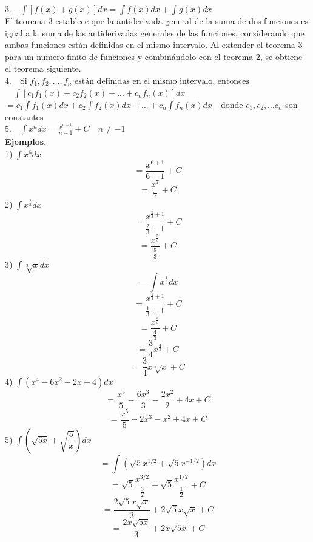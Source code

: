 \documentclass[11pt]{report}
\begin{document}
\hspace*{10mm}3.$\quad\displaystyle\int [f(x)+g(x)]dx=\int f(x)dx + \int g(x)dx$\\[2mm]
\hspace*{10mm}El teorema 3 establece que la antiderivada general de la suma de dos funciones es igual a la suma de las antiderivadas generales de las funciones, considerando que ambas funciones están definidas en el mismo intervalo. Al extender el teorema 3 para un numero finito de funciones y combinándolo con el teorema 2, se obtiene el teorema siguiente.\\[2mm]
\hspace*{10mm}4.$\quad\text{Si $f_1,f_2,...,f_n$ están definidas en el mismo intervalo, entonces}$\\[2mm]
\hspace*{12mm}$\quad\displaystyle\int [c_1f_1(x)+c_2f_2(x)+...+c_nf_n(x)]dx$\\[2mm]
\hspace*{22mm}$=c_1\displaystyle\int f_1(x)dx+c_2\int f_2(x)dx+...+c_n\int f_n(x)dx\quad$donde $c_1,c_2,...c_n$ son constantes\\[2mm]
\hspace*{10mm}5.$\quad\displaystyle\int x^ndx=\frac{x^{n+1}}{n+1}+C\quad n\neq -1$\\[2mm]
\textbf{Ejemplos.}\\[2mm]
1) $\displaystyle\int x^6dx$
$$=\frac{x^{6+1}}{6+1}+C$$
$$=\frac{x^7}{7}+C$$
2) $\displaystyle\int x^{\frac{2}{3}}dx$
$$=\frac{x^{\frac{2}{3}+1}}{\frac{2}{3}+1}+C$$
$$=\frac{x^{\frac{5}{3}}}{\frac{5}{3}}+C$$
3) $\displaystyle\int \sqrt[3]{x}dx$
$$=\int x^{\frac{1}{3}}dx$$
$$=\frac{x^{\frac{1}{3}+1}}{\frac{1}{3}+1}+C$$
$$=\frac{x^{\frac{4}{3}}}{\frac{4}{3}}+C$$
$$=\frac{3}{4}x^{\frac{4}{3}}+C$$
$$=\frac{3}{4}x\sqrt[3]{x}+C$$
4) $\displaystyle\int (x^4-6x^2-2x+4)dx$
$$=\frac{x^5}{5}-\frac{6x^3}{3}-\frac{2x^2}{2}+4x+C$$
$$=\frac{x^5}{5}-2x^3-x^2+4x+C$$
5) $\displaystyle\int \left( \sqrt{5x}+\sqrt{\dfrac{5}{x}} \right) dx$
$$=\int (\sqrt{5}x^{1/2}+\sqrt{5}x^{-1/2})dx$$
$$=\sqrt{5}\frac{x^{3/2}}{\frac{3}{2}}+\sqrt{5}\frac{x^{1/2}}{\frac{1}{2}}+C$$
$$=\frac{2\sqrt{5}x\sqrt{x}}{3}+2\sqrt{5}x\sqrt{x}+C$$
$$=\frac{2x\sqrt{5x}}{3}+2x\sqrt{5x}+C$$
\end{document}

